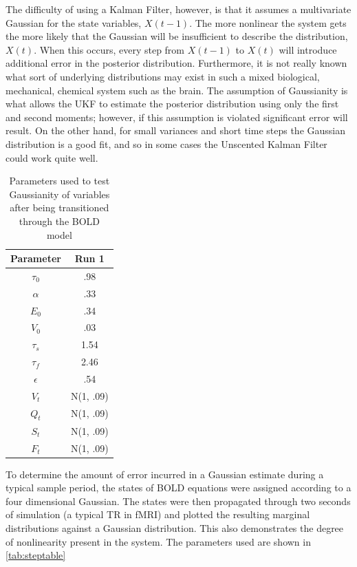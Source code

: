 The difficulty
of using a Kalman Filter, however, is that it assumes a multivariate 
Gaussian for the state variables, $X(t-1)$. The more nonlinear the system
gets the more likely that the Gaussian will be insufficient to describe
the distribution, $X(t)$. When this occurs, every step from  $X(t-1)$ 
to $X(t)$ will introduce additional
error in the posterior distribution. Furthermore, it is not really known what 
sort of underlying distributions may exist in such a mixed biological,
mechanical, chemical system such as the brain.
 The assumption of Gaussianity is what allows
the \ac{UKF} to estimate the posterior distribution using only the 
first and second moments;
however, if this assumption is violated significant error will result.
 On the other hand, for
small variances and short time steps the Gaussian distribution is a good 
fit, and so in some cases the Unscented Kalman Filter could work quite
well. 
\begin{table}[t]
\centering
\begin{tabular}{|c || c |}
\hline 
Parameter & Run 1 \\
\hline
$\tau_0$ & .98  \\
$\alpha$ & .33 \\
$E_0$ & .34  \\
$V_0$ & .03  \\
$\tau_s$ & 1.54  \\
$\tau_f$ & 2.46  \\
$\epsilon$ & .54  \\
$V_t$ & N(1, .09)  \\
$Q_t$ & N(1, .09)  \\
$S_t$ & N(1, .09) \\
$F_t$ & N(1, .09) \\
\hline
\end{tabular}
\caption{Parameters used to test Gaussianity of variables after being transitioned through
the \ac{BOLD} model}
\label{tab:steptable} 
\end{table}

To determine the amount of error incurred in a Gaussian estimate during
a typical sample period, the states of \ac{BOLD} equations were assigned according
to a four dimensional Gaussian. The states were then propagated through 
two seconds of simulation (a typical \ac{TR} in \ac{fMRI}) and plotted the resulting
marginal distributions against a Gaussian distribution. This also demonstrates
the degree of nonlinearity present in the system. The parameters used are 
shown in \autoref{tab:steptable}

